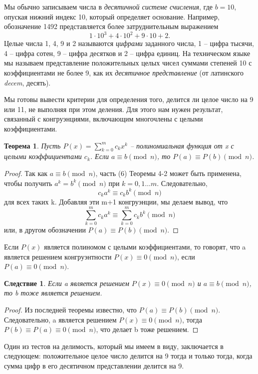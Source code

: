 \documentclass[11pt]{article}
\newtheorem{theorem}{Теорема}
\newtheorem{corollary}{Следствие}
\begin{document}
 Мы обычно записываем числа в {\it десятичной системе счисления}, где $ b=10 $, опуская нижний индекс 10, который определяет основание. Например, обозначение 1492 представляется более затруднительным выражением \[1\cdot10^{3}+4\cdot10^{2}+9\cdot10+2. \] Целые числа  1, 4, 9 и 2 называются {\it цифрами} заданного числа, 1 -- цифра тысячи, 4 -- цифра сотен, 9 -- цифра десятков и 2 -- цифра единиц. На техническом языке мы называем представление положительных целых чисел суммами степеней 10 с коэффициентами не более 9, как их {\it десятичное представление} (от латинского {\it decem}, десять).
 
 Мы готовы вывести критерии для определения того, делится ли целое число на 9 или 11, не выполняя при этом деления. Для этого нам нужен результат, связанный с конгруэнциями, включающим многочлены с целыми коэффициентами.

\begin{theorem}
	\label{th4-4}
Пусть $P(x)=\sum_{k=0}^mc_{k}x^{k} $ -- полиномиальная функция от  x  с целыми коэффициентами $ c_{k} $. Если  $a \equiv b \pmod{n}$, то $P(a) \equiv P(b) \pmod{n}$.
\end{theorem}

\begin{proof}
Так как $ a \equiv b \pmod{n} $, часть (6) Теоремы 4-2 может быть применена, чтобы получить $a^{k}=b^{k}\pmod{n}$ при $k=0,1\ldots m$. Следовательно, \[ c_{k}a^{k}\equiv c_{k}b^{k}\pmod{n} \] для всех таких k. Добавляя эти m+1 конгруэнции, мы делаем вывод, что \[  \sum \limits_{k=0}^{m}c_{k}a^{k} \equiv \sum\limits_{k=0}^{m}c_{k}b^{k}\pmod{n} \] или, в другом обозначении $P(a) \equiv P(b) \pmod{n}$.
\end{proof}

Если $P(x)$ является полиномом с целыми коэффициентами, то говорят, что a является решением конгруэнтности $ P(x)\equiv 0 \pmod{n} $, если $ P(a)\equiv 0 \pmod{n} $.

\begin{corollary}
Если a является решением $ P(x)\equiv 0 \pmod{n} $ и $a \equiv b \pmod{n}$, то b тоже является решением.	
\end{corollary}

\begin{proof}
Из последней теоремы известно, что $P(a) \equiv P(b) \pmod{n}$. Следовательно, a является решением $ P(x)\equiv 0 \pmod{n} $, тогда $ P(b)\equiv P(a) \equiv 0 \pmod{n}$, что делает b тоже решением.
\end{proof}

Один из тестов на делимость, который мы имеем в виду, заключается в следующем: положительное целое число делится на 9 тогда и только тогда, когда сумма цифр в его десятичном представлении делится на 9.
\end{document}

